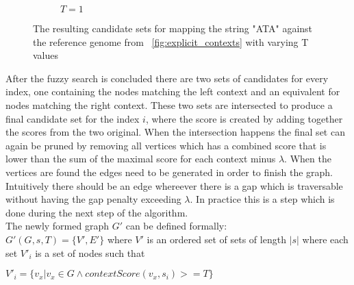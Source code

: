 \documentclass{article}
\begin{document}
\begin{wrapfigure}{r}{0.5\textwidth}
\begin{subfigure}[t]{\textwidth}
\begin{mdframed}
		\end{mdframed}
		\caption{$T=1$}
	\end{subfigure}
	\caption{The resulting candidate sets for mapping the string "ATA" against the reference genome from ~\ref{fig:explicit_contexts} with varying T values}
	\label{fig:candidate_nodes}
\end{wrapfigure}
After the fuzzy search is concluded there are two sets of candidates for every index, one containing the nodes matching the left context and an equivalent for nodes matching the right context. These two sets are intersected to produce a final candidate set for the index $i$, where the score is created by adding together the scores from the two original. When the intersection happens the final set can again be pruned by removing all vertices which has a combined score that is lower than the sum of the maximal score for each context minus $\lambda$. When the vertices are found the edges need to be generated in order to finish the graph. Intuitively there should be an edge whereever there is a gap which is traversable without having the gap penalty exceeding $\lambda$. In practice this is a step which is done during the next step of the algorithm.\\
\clearpage
The newly formed graph $G'$ can be defined formally:\\
$G'(G, s, T) = \{V', E'\}$ 
where $V'$ is an ordered set of sets of length $|s|$ where each set $V'_i$ is a set of nodes such that\\
\par
$V'_i=\{v_x|v_x \in G \wedge contextScore(v_x, s_i) >= T\}$\\
\end{document}
